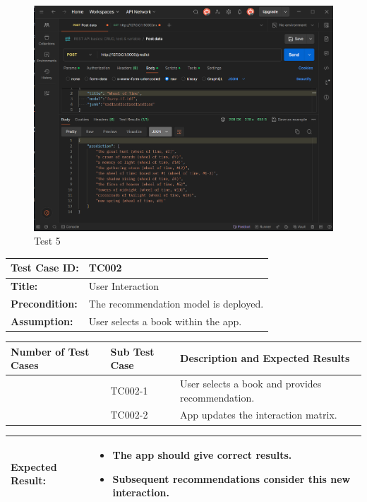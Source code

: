 \begin{figure}[htbp]
    \centering
    \includegraphics[width=1\textwidth]{../../assets/test_5.png}
    \caption{Test 5}
    \label{fig:test5}
\end{figure}


\noindent
\begin{tabularx}{\textwidth}{|>{\raggedright\arraybackslash}p{4cm}|X|}
    \hline
    \textbf{Test Case ID:} & TC002 \\ \hline
    \textbf{Title:} & User Interaction \\ \hline
    \textbf{Precondition:} & The recommendation model is deployed. \\ \hline
    \textbf{Assumption:} & User selects a book within the app. \\ \hline
\end{tabularx}

\noindent
\begin{tabularx}{\textwidth}{|>{\centering\arraybackslash}p{3cm}|>{\centering\arraybackslash}p{3cm}|X|}
    \hline
    \textbf{Number of Test Cases} & \textbf{Sub Test Case} & \textbf{Description and Expected Results} \\ \hline
    1 & TC002-1 & User selects a book and provides recommendation. \\ \hline
    2 & TC002-2 & App updates the interaction matrix. \\ \hline
\end{tabularx}

\noindent
\begin{tabularx}{\textwidth}{|>{\raggedright\arraybackslash}p{4cm}|X|}
    \hline
    \textbf{Expected Result:} & 
    \begin{itemize}
        \item The app should give correct results.
        \item Subsequent recommendations consider this new interaction.
    \end{itemize}
    \\ \hline
\end{tabularx}

